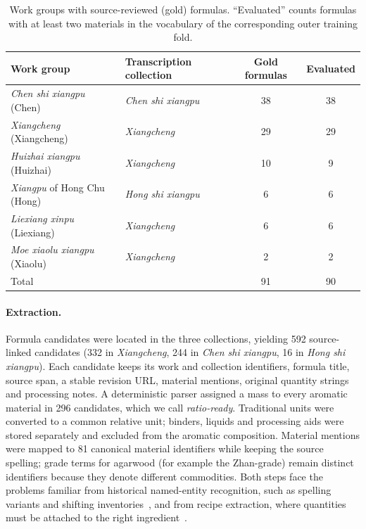 \documentclass[applsci,article,submit,oneauthor]{Definitions/mdpi}
\begin{document}
\begin{table}[H]
\caption{Work groups with source-reviewed (gold) formulas. ``Evaluated'' counts formulas with at least two materials in the vocabulary of the corresponding outer training fold.}
\label{tab:works}
\small
\begin{tabularx}{\textwidth}{Llcc}
\toprule
\textbf{Work group} & \textbf{Transcription collection} & \textbf{Gold formulas} & \textbf{Evaluated} \\
\midrule
\emph{Chen shi xiangpu} (Chen) & \emph{Chen shi xiangpu} & 38 & 38 \\
\emph{Xiangcheng} (Xiangcheng) & \emph{Xiangcheng} & 29 & 29 \\
\emph{Huizhai xiangpu} (Huizhai) & \emph{Xiangcheng} & 10 & 9 \\
\emph{Xiangpu} of Hong Chu (Hong) & \emph{Hong shi xiangpu} & 6 & 6 \\
\emph{Liexiang xinpu} (Liexiang) & \emph{Xiangcheng} & 6 & 6 \\
\emph{Moe xiaolu xiangpu} (Xiaolu) & \emph{Xiangcheng} & 2 & 2 \\
\midrule
Total & & 91 & 90 \\
\bottomrule
\end{tabularx}
\end{table}

\paragraph{Extraction.} Formula candidates were located in the three collections, yielding 592 source-linked candidates (332 in \emph{Xiangcheng}, 244 in \emph{Chen shi xiangpu}, 16 in \emph{Hong shi xiangpu}). Each candidate keeps its work and collection identifiers, formula title, source span, a stable revision URL, material mentions, original quantity strings and processing notes. A deterministic parser assigned a mass to every aromatic material in 296 candidates, which we call \emph{ratio-ready}. Traditional units were converted to a common relative unit; binders, liquids and processing aids were stored separately and excluded from the aromatic composition. Material mentions were mapped to 81 canonical material identifiers while keeping the source spelling; grade terms for agarwood (for example the Zhan-grade) remain distinct identifiers because they denote different commodities. Both steps face the problems familiar from historical named-entity recognition, such as spelling variants and shifting inventories~\cite{sorbi2026}, and from recipe extraction, where quantities must be attached to the right ingredient~\cite{goel2024}.
\end{document}

